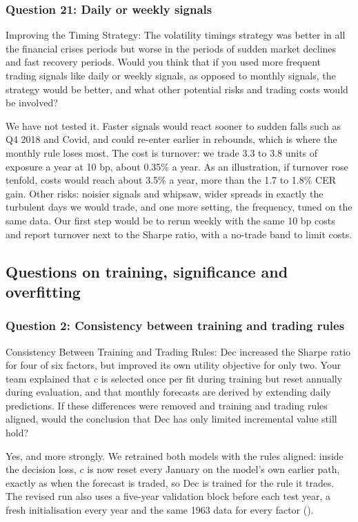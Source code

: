 \subsubsection*{Question 21: Daily or weekly signals}
\begin{question}
Improving the Timing Strategy: The volatility timings strategy was better in all the financial crises periods but worse in the periods of sudden market declines and fast recovery periods. Would you think that if you used more frequent trading signals like daily or weekly signals, as opposed to monthly signals, the strategy would be better, and what other potential risks and trading costs would be involved?
\end{question}
We have not tested it. Faster signals would react sooner to sudden falls such as Q4 2018 and Covid, and could re-enter earlier in rebounds, which is where the monthly rule loses most. The cost is turnover: we trade 3.3 to 3.8 units of exposure a year at 10 bp, about 0.35\% a year. As an illustration, if turnover rose tenfold, costs would reach about 3.5\% a year, more than the 1.7 to 1.8\% CER gain. Other risks: noisier signals and whipsaw, wider spreads in exactly the turbulent days we would trade, and one more setting, the frequency, tuned on the same data. Our first step would be to rerun weekly with the same 10 bp costs and report turnover next to the Sharpe ratio, with a no-trade band to limit costs.

\subsection{Questions on training, significance and overfitting}

\subsubsection*{Question 2: Consistency between training and trading rules}
\begin{question}
Consistency Between Training and Trading Rules: Dec increased the Sharpe ratio for four of six factors, but improved its own utility objective for only two. Your team explained that c is selected once per fit during training but reset annually during evaluation, and that monthly forecasts are derived by extending daily predictions. If these differences were removed and training and trading rules aligned, would the conclusion that Dec has only limited incremental value still hold?
\end{question}
Yes, and more strongly. We retrained both models with the rules aligned: inside the decision loss, $c$ is now reset every January on the model's own earlier path, exactly as when the forecast is traded, so Dec is trained for the rule it trades. The revised run also uses a five-year validation block before each test year, a fresh initialisation every year and the same 1963 data for every factor ().

